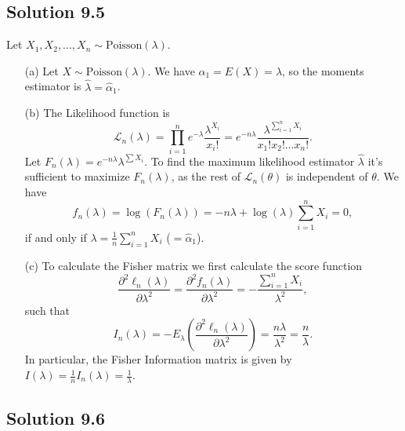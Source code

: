 \subsection*{Solution 9.5}

Let $X_1, X_2, ..., X_n \sim \mathrm{Poisson}(\lambda)$.
\begin{itemize}
    \item[(a)] Let $X \sim \mathrm{Poisson}(\lambda)$.
        We have $\alpha_1 = E(X) = \lambda$, so the moments estimator is $\hat{\lambda} = \hat{\alpha}_1$.
    \item[(b)] The Likelihood function is
        \begin{equation*}
            \mathcal{L}_n(\lambda)
                = \prod_{i = 1}^n e^{-\lambda} \frac{\lambda^{X_i}}{x_i!}
                = e^{-n\lambda} \frac{\lambda^{\sum_{i = 1}^n X_i}}{x_1! x_2! \dots x_n!}.
        \end{equation*}
        Let $F_n(\lambda) = e^{-n\lambda} \lambda^{\sum X_i}$.
        To find the maximum likelihood estimator $\hat{\lambda}$ it's sufficient to maximize $F_n(\lambda)$, as the rest of $\mathcal{L}_n(\theta)$ is independent of $\theta$.
        We have
        \begin{equation*}
            f_n(\lambda)
                = \log(F_n(\lambda))
                = -n\lambda + \log(\lambda) \sum_{i = 1}^n X_i
                = 0,
        \end{equation*}
        if and only if $\lambda = \frac{1}{n} \sum_{i = 1}^n X_i$ ($= \hat{\alpha}_1$).
    \item[(c)] To calculate the Fisher matrix we first calculate the score function
        \begin{equation*}
            \frac{\partial^2 \ell_n(\lambda)}{\partial \lambda^2}
                = \frac{\partial^2 f_n(\lambda)}{\partial \lambda^2}
                = -\frac{\sum_{i = 1}^n X_i}{\lambda^2},
        \end{equation*}
        such that
        \begin{equation*}
            I_n(\lambda)
                = -E_{\lambda}\left(\frac{\partial^2 \ell_n(\lambda)}{\partial \lambda^2}\right)
                = \frac{n\lambda}{\lambda^2}
                = \frac{n}{\lambda}.
        \end{equation*}
        In particular, the Fisher Information matrix is given by $I(\lambda) = \frac{1}{n} I_n(\lambda) = \frac{1}{\lambda}$.
\end{itemize}


\subsection*{Solution 9.6}

